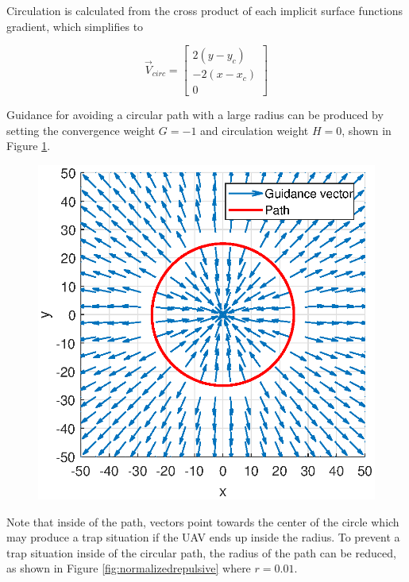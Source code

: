 \documentclass[conf]{new-aiaa}
\begin{document}
Circulation is calculated from the cross product of each implicit surface functions gradient, which simplifies to

\begin{equation}\label{eq:vcirc_circle}
\overrightarrow{V}_{circ} =  \begin{bmatrix}  2(y-y_c) \\[6pt] -2(x-x_c) \\[6pt] 0\end{bmatrix}
\end{equation}

Guidance for avoiding a circular path with a large radius can be produced by setting the convergence weight $G=-1$ and circulation weight $H=0$, shown in Figure \ref{fig:largerepulsive}. 

\begin{figure}[H]
	\centering
	\includegraphics[width=0.7\linewidth]{Figures/methods/largeRepulsive}
	\caption{}
	\label{fig:largerepulsive}
\end{figure}

Note that inside of the path, vectors point towards the center of the circle which may produce a trap situation if the UAV ends up inside the radius. To prevent a trap situation inside of the circular path, the radius of the path can be reduced, as shown in Figure \ref{fig:normalizedrepulsive} where $r=0.01$.
\end{document}
